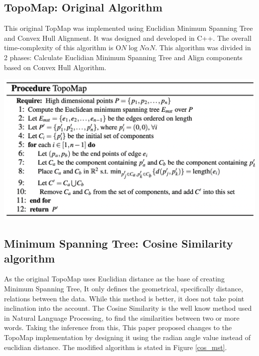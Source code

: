 \documentclass[11pt, a4paper]{article}
\newenvironment{Figure}
  {\par\medskip\noindent\minipage{\linewidth}}
  {\endminipage\par\medskip}
\begin{document}
\begin{multicols}{2}
        \subsection{TopoMap: Original Algorithm}
        This original TopMap\cite{harishd} was implemented using Euclidian Minimum Spanning Tree and Convex Hull Alignment. It was designed and developed in C++. The overall time-complexity of this algorithm is O\(N\log{N}\alpha N\). This algorithm was divided in 2 phases: Calculate Euclidian Minimum Spanning Tree and Align components based on Convex Hull Algorithm.
        
        \begin{Figure}
            \centering
            \includegraphics[width=\linewidth]{original_topomap.png}
            \label{orig_topomap}
        \end{Figure}
        
        \subsection{Minimum Spanning Tree: Cosine Similarity algorithm}
        As the original TopoMap\cite{harishd} uses Euclidian distance as the base of creating Minimum Spanning Tree, It only defines the geometrical, specifically distance, relations between the data. While this method is better, it does not take point inclination into the account. The Cosine Similarity is the well know method used in Natural Language Processing, to find the similarities between two or more words. Taking the inference from this, This paper proposed changes to the TopoMap\cite{harishd} implementation by designing it using the radian angle value instead of euclidian distance. The modified algorithm is stated in Figure \ref*{cos_mst}.
\end{multicols}
\end{document}
